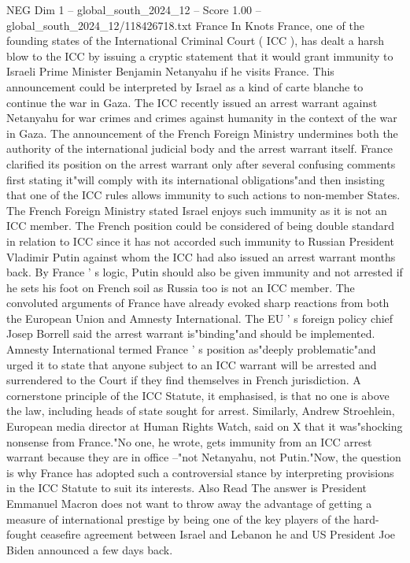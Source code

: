 \begin{textsample}{NEG Dim 1 – global\_south\_2024\_12 – Score 1.00 – global\_south\_2024\_12/118426718.txt}  \label{ex:f1_neg_341}
France In Knots France, one of the founding states of the International Criminal Court ( ICC ), has dealt a harsh blow to the ICC by issuing a cryptic statement that it would grant immunity to Israeli Prime Minister Benjamin Netanyahu if he visits France.
This announcement could be interpreted by Israel as a kind of carte blanche to continue the war in Gaza.
The ICC recently issued an arrest warrant against Netanyahu for war crimes and crimes against humanity in the context of the war in Gaza.
The announcement of the French Foreign Ministry undermines both the authority of the international judicial body and the arrest warrant itself.
France clarified its position on the arrest warrant only after several confusing comments first stating it"will comply with its international obligations"and then insisting that one of the ICC rules allows immunity to such actions to non-member States.
The French Foreign Ministry stated Israel enjoys such immunity as it is not an ICC member.
The French position could be considered of being double standard in relation to ICC since it has not accorded such immunity to Russian President Vladimir Putin against whom the ICC had also issued an arrest warrant months back.
By France ' s logic, Putin should also be given immunity and not arrested if he sets his foot on French soil as Russia too is not an ICC member.
The convoluted arguments of France have already evoked sharp reactions from both the European Union and Amnesty International.
The EU ' s foreign policy chief Josep Borrell said the arrest warrant is"binding"and should be implemented.
Amnesty International termed France ' s position as"deeply problematic"and urged it to state that anyone subject to an ICC warrant will be arrested and surrendered to the Court if they find themselves in French jurisdiction.
A cornerstone principle of the ICC Statute, it emphasised, is that no one is above the law, including heads of state sought for arrest.
Similarly, Andrew Stroehlein, European media director at Human Rights Watch, said on X that it was"shocking nonsense from France."No one, he wrote, gets immunity from an ICC arrest warrant because they are in office --"not Netanyahu, not Putin."Now, the question is why France has adopted such a controversial stance by interpreting provisions in the ICC Statute to suit its interests.
Also Read The answer is President Emmanuel Macron does not want to throw away the advantage of getting a measure of international prestige by being one of the key players of the hard-fought ceasefire agreement between Israel and Lebanon he and US President Joe Biden announced a few days back.

\end{textsample}

